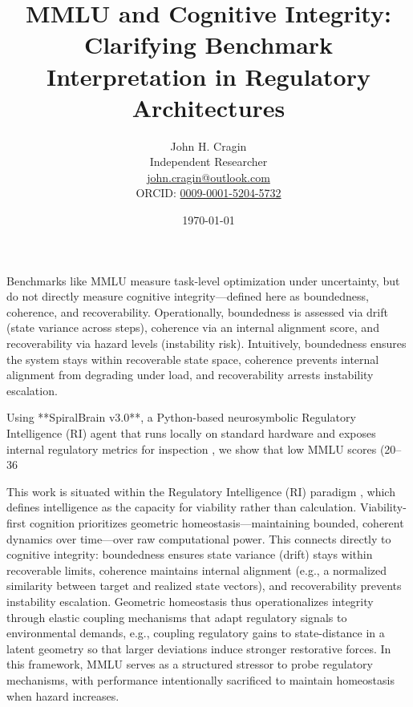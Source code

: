 \documentclass[12pt,a4paper]{article}
\title{MMLU and Cognitive Integrity: Clarifying Benchmark Interpretation in Regulatory Architectures}
\author{John H. Cragin \\
Independent Researcher \\
\href{mailto:john.cragin@outlook.com}{john.cragin@outlook.com} \\
ORCID: \href{https://orcid.org/0009-0001-5204-5732}{0009-0001-5204-5732}}
\date{\today}
\renewenvironment{abstract}{
    \begin{center}
        {\large\bfseries \abstractname\vspace{-.5em}\vspace{0pt}}
    \end{center}
}{}
\begin{document}
\sloppy

\maketitle

\begin{abstract}

Benchmarks like MMLU measure task-level optimization under uncertainty, but do not directly measure cognitive integrity—defined here as boundedness, coherence, and recoverability. Operationally, boundedness is assessed via drift (state variance across steps), coherence via an internal alignment score, and recoverability via hazard levels (instability risk). Intuitively, boundedness ensures the system stays within recoverable state space, coherence prevents internal alignment from degrading under load, and recoverability arrests instability escalation.

Using **SpiralBrain v3.0**, a Python-based neurosymbolic Regulatory Intelligence (RI) agent that runs locally on standard hardware and exposes internal regulatory metrics for inspection \cite{SpiralBrainV3,Cragin2026RI}, we show that low MMLU scores (20–36%

This work is situated within the Regulatory Intelligence (RI) paradigm \cite{Cragin2026RI}, which defines intelligence as the capacity for viability rather than calculation. Viability-first cognition prioritizes geometric homeostasis—maintaining bounded, coherent dynamics over time—over raw computational power. This connects directly to cognitive integrity: boundedness ensures state variance (drift) stays within recoverable limits, coherence maintains internal alignment (e.g., a normalized similarity between target and realized state vectors), and recoverability prevents instability escalation. Geometric homeostasis thus operationalizes integrity through elastic coupling mechanisms that adapt regulatory signals to environmental demands, e.g., coupling regulatory gains to state-distance in a latent geometry so that larger deviations induce stronger restorative forces. In this framework, MMLU serves as a structured stressor to probe regulatory mechanisms, with performance intentionally sacrificed to maintain homeostasis when hazard increases.

\end{abstract}
\end{document}
